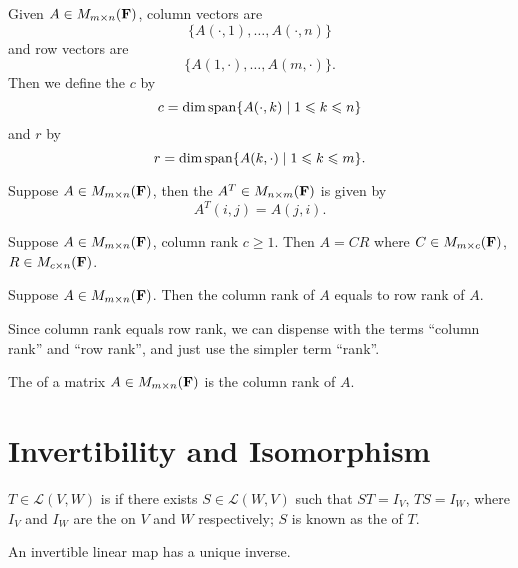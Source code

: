 \begin{definition}
Given $A\in M_{m\times n}(\mathbf F)$, column vectors are
\[\{A(\cdot,1),\dots,A(\cdot,n)\}\]
and row vectors are
\[\{A(1,\cdot),\dots,A(m,\cdot)\}.\]
Then we define the  $c$ by
\[c=\dim\operatorname{span}\{A(\cdot,k)\mid1\leqslant k\leqslant n\}\]
and  $r$ by
\[r=\dim\operatorname{span}\{A(k,\cdot)\mid1\leqslant k\leqslant m\}.\]
\end{definition}

\begin{definition}[Transpose]
Suppose $A\in M_{m\times n}(\mathbf F)$, then the  $A^T\in M_{n\times m}(\mathbf F)$ is given by
\[A^T(i,j)=A(j,i).\]
\end{definition}

\begin{proposition}
Suppose $A\in M_{m\times n}(\mathbf F)$, column rank $c\ge1$. Then $A=CR$ where $C\in M_{m\times c}(\mathbf F)$, $R\in M_{c\times n}(\mathbf F)$.
\end{proposition}

\begin{proposition}
Suppose $A\in M_{m\times n}(\mathbf F)$. Then the column rank of $A$ equals to row rank of $A$.
\end{proposition}

Since column rank equals row rank, we can dispense with the terms ``column rank'' and ``row rank'', and just use the simpler
term ``rank''.

\begin{definition}[Rank]
The  of a matrix $A\in M_{m\times n}(\mathbf F)$ is the column rank of $A$.
\end{definition}

\section{Invertibility and Isomorphism}
\begin{definition}[Invertibility]
$T\in\mathcal{L}(V,W)$ is  if there exists $S\in\mathcal{L}(W,V)$ such that $ST=I_V$, $TS=I_W$, where $I_V$ and $I_W$ are the  on $V$ and $W$ respectively; $S$ is known as the  of $T$.
\end{definition}

\begin{proposition}
An invertible linear map has a unique inverse.
\end{proposition}

